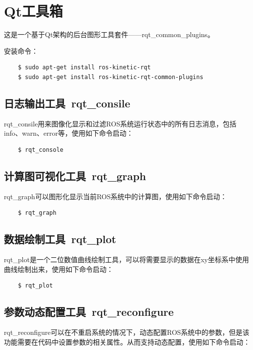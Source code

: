 \documentclass[10pt, oneside]{book}
\begin{document}
\section{Qt工具箱}

这是一个基于Qt架构的后台图形工具套件——rqt\_common\_plugins。

安装命令：

\begin{verbatim}
    $ sudo apt-get install ros-kinetic-rqt
    $ sudo apt-get install ros-kinetic-rqt-common-plugins
\end{verbatim}

\subsection{日志输出工具\ rqt\_consile}

rqt\_consile用来图像化显示和过滤ROS系统运行状态中的所有日志消息，包括info、warn、error等，使用如下命令启动：

\begin{verbatim}
    $ rqt_console
\end{verbatim}

\subsection{计算图可视化工具\ rqt\_graph}

rqt\_graph可以图形化显示当前ROS系统中的计算图，使用如下命令启动：

\begin{verbatim}
    $ rqt_graph
\end{verbatim}

\subsection{数据绘制工具\ rqt\_plot}

rqt\_plot是一个二位数值曲线绘制工具，可以将需要显示的数据在xy坐标系中使用曲线绘制出来，使用如下命令启动：

\begin{verbatim}
    $ rqt_plot
\end{verbatim}

\subsection{参数动态配置工具\ rqt\_reconfigure}

rqt\_reconfigure可以在不重启系统的情况下，动态配置ROS系统中的参数，但是该功能需要在代码中设置参数的相关属性。从而支持动态配置，使用如下命令启动：
\end{document}
